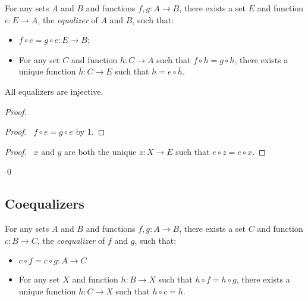 \begin{ax}[Equalizers]
  For any sets $A$ and $B$ and functions $f, g : A \rightarrow B$, there
  exists a set $E$ and function $e : E \rightarrow A$, the \emph{equalizer}
  of
  $A$ and $B$, such that:
  \begin{itemize}
    \item $f \circ e = g \circ e : E \rightarrow B$;
    \item For any set $C$ and function $h : C \rightarrow A$ such that $f
    \circ h
    = g \circ h$, there exists a unique function $\overline{h} : C
    \rightarrow
    E$
    such that $h = e \circ \overline{h}$.
  \end{itemize}
\end{ax}

\begin{prop}
  \label{prop:set_theory:equalizer:injective}
 All equalizers are injective.
\end{prop}

\begin{proof}
 \pf
 \begin{proof}
   \pf\ $f \circ e = g \circ e$ by 1.
 \end{proof}
 \begin{proof}
   \pf\ $x$ and $y$ are both the unique $z : X \rightarrow E$ such that $e
   \circ z = e \circ x$.
 \end{proof}
 \qed
\end{proof}

\subsection{Coequalizers}

\begin{ax}[Coequalizers]
  For any sets $A$ and $B$ and functions $f, g : A \rightarrow B$, there
  exists a set $C$ and function $c : B \rightarrow C$, the \emph{coequalizer}
  of $f$ and $g$, such that:
  \begin{itemize}
    \item $c \circ f = c \circ g : A \rightarrow C$
    \item For any set $X$ and function $h : B \rightarrow X$ such that $h
    \circ f
    = h \circ g$, there exists a unique function $\overline{h} : C
    \rightarrow
    X$
    such that $\overline{h} \circ c = h$.
  \end{itemize}
\end{ax}

